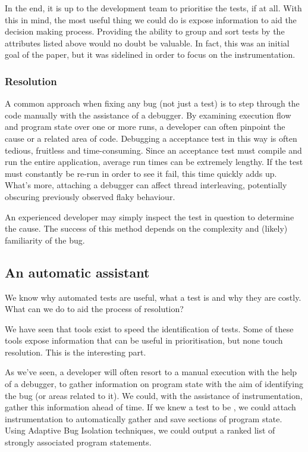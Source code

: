 In the end, it is up to the development team to prioritise the \flaky{} tests, if at all. With this in mind, the most useful thing we could do is expose information to aid the decision making process. Providing the ability to group and sort \flaky{} tests by the attributes listed above would no doubt be valuable. In fact, this was an initial goal of the paper, but it was sidelined in order to focus on the instrumentation.

\subsubsection{Resolution}

A common approach when fixing any bug (not just a \flaky{} test) is to step through the code manually with the assistance of a debugger. By examining execution flow and program state over one or more runs, a developer can often pinpoint the cause or a related area of code. Debugging a \flaky{} acceptance test in this way is often tedious, fruitless and time-consuming. Since an acceptance test must compile and run the entire application, average run times can be extremely lengthy. If the test must constantly be re-run in order to see it fail, this time quickly adds up. What's more, attaching a debugger can affect thread interleaving, potentially obscuring previously observed flaky behaviour.

An experienced developer may simply inspect the test in question to determine the cause. The success of this method depends on the complexity and (likely) familiarity of the bug.


\subsection{An automatic assistant}

We know why automated tests are useful, what a \flaky{} test is and why they are costly. What can we do to aid the process of resolution?

We have seen that tools exist to speed the identification of \flaky{} tests. Some of these tools expose information that can be useful in prioritisation, but none touch resolution. This is the interesting part.

As we've seen, a developer will often resort to a manual execution with the help of a debugger, to gather information on program state with the aim of identifying the bug (or areas related to it). We could, with the assistance of instrumentation, gather this information ahead of time. If we knew a test to be \flaky{}, we could attach instrumentation to automatically gather and save sections of program state. Using Adaptive Bug Isolation techniques, we could output a ranked list of strongly associated program statements.


